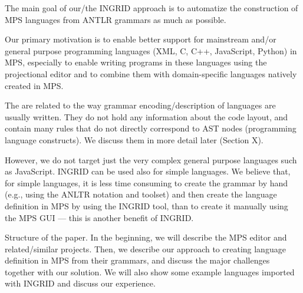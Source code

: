 The main goal of our/the INGRID approach is to automatize the construction of MPS languages from ANTLR grammars as much as possible.


Our primary motivation is to enable better support for mainstream and/or general purpose programming languages (XML, C, C++, JavaScript, Python) in MPS, especially to enable writing programs in these languages using the projectional editor and to combine them with domain-specific languages natively created in MPS.

The are related to the way grammar encoding/description of languages are usually written.
They do not hold any information about the code layout, and contain many rules that do not directly correspond to AST nodes (programming language constructs).
We discuss them in more detail later (Section X).


However, we do not target just the very complex general purpose languages such as JavaScript.
INGRID can be used also for simple languages.
We believe that, for simple languages, it is less time consuming to create the grammar by hand (e.g., using the ANLTR notation and toolset) and then create the language definition in MPS by using the INGRID tool, than to create it manually using the MPS GUI --- this is another benefit of INGRID.

Structure of the paper.
In the beginning, we will describe the MPS editor and related/similar projects.
Then, we describe our approach to creating language definition in MPS from their grammars, and discuss the major challenges together with our solution.
We will also show some example languages imported with INGRID and discuss our experience.
